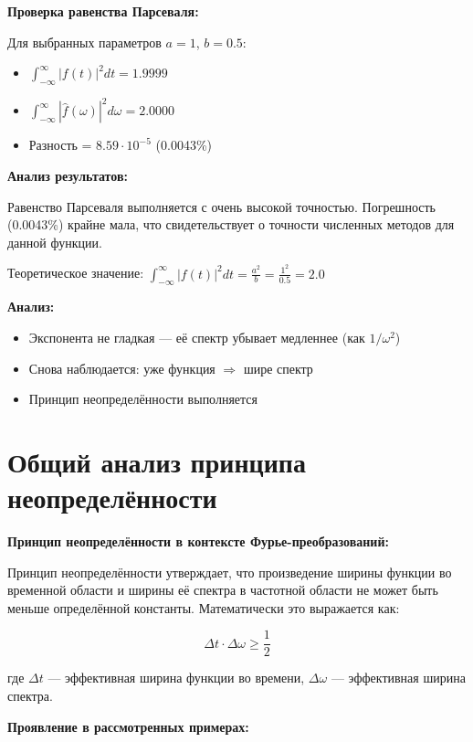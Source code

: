 \textbf{Проверка равенства Парсеваля:}

Для выбранных параметров $a = 1$, $b = 0.5$:
\begin{itemize}
    \item $\displaystyle \int_{-\infty}^{\infty} |f(t)|^2 dt = 1.9999$
    \item $\displaystyle \int_{-\infty}^{\infty} |\hat{f}(\omega)|^2 d\omega = 2.0000$
    \item Разность = $8.59 \cdot 10^{-5}$ (0.0043\%)
\end{itemize}

\textbf{Анализ результатов:}

Равенство Парсеваля выполняется с очень высокой точностью. Погрешность (0.0043\%) крайне мала, что свидетельствует о точности численных методов для данной функции.

Теоретическое значение: $\displaystyle \int_{-\infty}^{\infty} |f(t)|^2 dt = \frac{a^2}{b} = \frac{1^2}{0.5} = 2.0$

\textbf{Анализ:}

\begin{itemize}
    \item Экспонента не гладкая — её спектр убывает медленнее (как $1/\omega^2$)
    \item Снова наблюдается: уже функция $\Rightarrow$ шире спектр
    \item Принцип неопределённости выполняется
\end{itemize}

\section*{Общий анализ принципа неопределённости}

\textbf{Принцип неопределённости в контексте Фурье-преобразований:}

Принцип неопределённости утверждает, что произведение ширины функции во временной области и ширины её спектра в частотной области не может быть меньше определённой константы. Математически это выражается как:

\[
\Delta t \cdot \Delta \omega \geq \frac{1}{2}
\]

где $\Delta t$ — эффективная ширина функции во времени, $\Delta \omega$ — эффективная ширина спектра.

\textbf{Проявление в рассмотренных примерах:}

